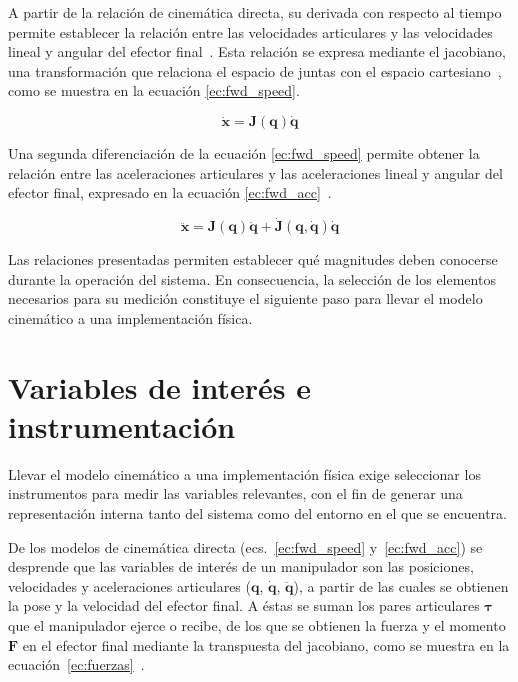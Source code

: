 A partir de la relación de cinemática directa, su derivada con respecto al tiempo permite establecer la relación entre las velocidades articulares y las velocidades lineal y angular del efector final~\cite{handbook_kinematics}. Esta relación se expresa mediante el jacobiano, una transformación que relaciona el espacio de juntas con el espacio cartesiano~\cite{craig}, como se muestra en la ecuación \ref{ec:fwd_speed}.

\begin{equation}
\label{ec:fwd_speed}
\dot{\mathbf{x}} = \mathbf{J}(\mathbf{q})\dot{\mathbf{q}}
\end{equation}

Una segunda diferenciación de la ecuación \ref{ec:fwd_speed} permite obtener la relación entre las aceleraciones articulares y las aceleraciones lineal y angular del efector final, expresado en la ecuación \ref{ec:fwd_acc}~\cite{haviland}.

\begin{equation}
\label{ec:fwd_acc}
\ddot{\mathbf{x}} =
\mathbf{J}(\mathbf{q})\ddot{\mathbf{q}}
+
\dot{\mathbf{J}}(\mathbf{q},\dot{\mathbf{q}})\dot{\mathbf{q}}
\end{equation}

Las relaciones presentadas permiten establecer qué magnitudes deben conocerse durante la operación del sistema. En consecuencia, la selección de los elementos necesarios para su medición constituye el siguiente paso para llevar el modelo cinemático a una implementación física.

\section{Variables de interés e instrumentación}

Llevar el modelo cinemático a una implementación física exige seleccionar los instrumentos para medir las variables relevantes, con el fin de generar una representación interna tanto del sistema como del entorno en el que se encuentra.

De los modelos de cinemática directa (ecs.~\ref{ec:fwd_speed} y~\ref{ec:fwd_acc}) se desprende que las variables de interés de un manipulador son las posiciones, velocidades y aceleraciones articulares ($\mathbf{q}$, $\dot{\mathbf{q}}$, $\ddot{\mathbf{q}}$), a partir de las cuales se obtienen la pose y la velocidad del efector final. A éstas se suman los pares articulares $\boldsymbol{\tau}$ que el manipulador ejerce o recibe, de los que se obtienen la fuerza y el momento $\mathbf{F}$ en el efector final mediante la transpuesta del jacobiano, como se muestra en la ecuación~\ref{ec:fuerzas}~\cite{craig}.

